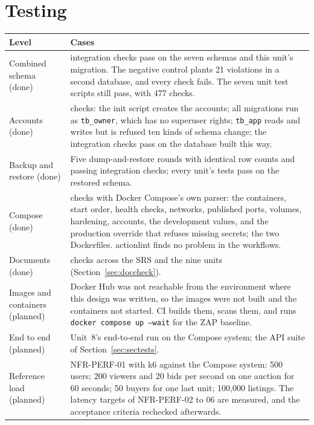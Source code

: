 \documentclass[11pt,a4paper]{article}
\newenvironment{dtable}[1]{\small\begin{longtable}{#1}}{\end{longtable}}
\begin{document}
\section{Testing}
\label{sec:testing}
\begin{dtable}{@{}>{\raggedright\arraybackslash}p{3.4cm}>{\raggedright\arraybackslash}p{11.8cm}@{}}
\toprule
\textbf{Level} & \textbf{Cases} \\ \midrule \endhead
Combined schema (done) & 21 integration checks pass on the seven schemas and this unit's migration. The negative control plants 21 violations in a second database, and every check fails. The seven unit test scripts still pass, with 477 checks. \\
Accounts (done) & 17 checks: the init script creates the accounts; all migrations run as \texttt{tb\_owner}, which has no superuser rights; \texttt{tb\_app} reads and writes but is refused ten kinds of schema change; the integration checks pass on the database built this way. \\
Backup and restore (done) & Five dump-and-restore rounds with identical row counts and passing integration checks; every unit's tests pass on the restored schema. \\
Compose (done) & 32 checks with Docker Compose's own parser: the containers, start order, health checks, networks, published ports, volumes, hardening, accounts, the development values, and the production override that refuses missing secrets; the two Dockerfiles. actionlint finds no problem in the workflows. \\
Documents (done) & 11 checks across the SRS and the nine units (Section~\ref{sec:doccheck}). \\
Images and containers (planned) & Docker Hub was not reachable from the environment where this design was written, so the images were not built and the containers not started. CI builds them, scans them, and runs \texttt{docker compose up --wait} for the ZAP baseline. \\
End to end (planned) & Unit~8's end-to-end run on the Compose system; the API suite of Section~\ref{sec:sectests}. \\
Reference load (planned) & NFR-PERF-01 with k6 against the Compose system: 500 users; 200 viewers and 20 bids per second on one auction for 60 seconds; 50 buyers for one last unit; 100{,}000 listings. The latency targets of NFR-PERF-02 to 06 are measured, and the acceptance criteria rechecked afterwards. \\
\bottomrule
\end{dtable}
\end{document}
